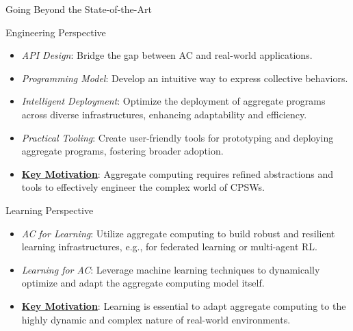 \documentclass[presentation, 9pt,169]{beamer}\mode<presentation>{\usetheme{AMSBolognaFC}}
\begin{document}
\begin{frame}{Going Beyond the State-of-the-Art}

  \begin{alertblock}{Engineering Perspective}
    \begin{itemize}
        \item \emph{API Design}: Bridge the gap between AC and real-world applications.
        \item \emph{Programming Model}: Develop an intuitive way to express collective behaviors.
        \item \emph{Intelligent Deployment}: Optimize the deployment of aggregate programs across diverse infrastructures, enhancing adaptability and efficiency.
        \item \emph{Practical Tooling}: Create user-friendly tools for prototyping and deploying aggregate programs, fostering broader adoption.
        \item \textbf{\underline{Key Motivation}}: Aggregate computing requires refined abstractions and tools to effectively engineer the complex world of CPSWs.
    \end{itemize}
  \end{alertblock}

  \begin{alertblock}{Learning Perspective}
    \begin{itemize}
        \item \emph{AC for Learning}: Utilize aggregate computing to build robust and resilient learning infrastructures, e.g., for federated learning or multi-agent RL.
        \item \emph{Learning for AC}: Leverage machine learning techniques to dynamically optimize and adapt the aggregate computing model itself.
        \item \textbf{\underline{Key Motivation}}: Learning is essential to adapt aggregate computing to the highly dynamic and complex nature of real-world environments.
    \end{itemize}
  \end{alertblock}

\end{frame}
\end{document}

